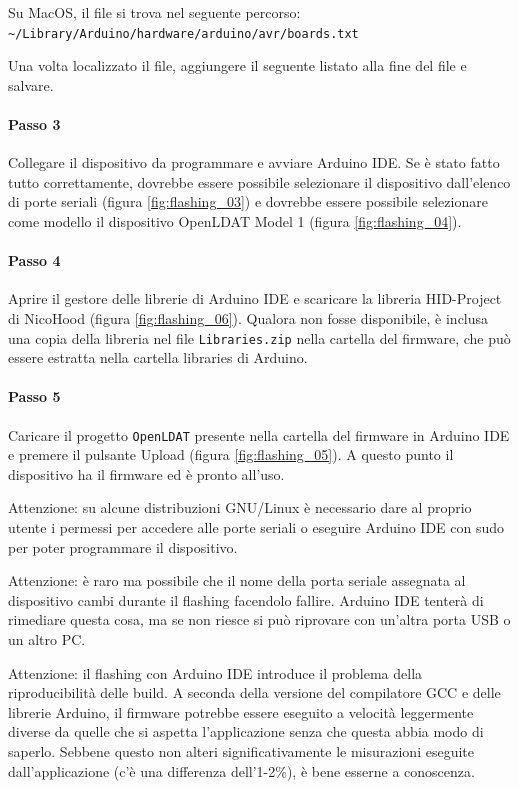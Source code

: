 Su MacOS, il file si trova nel seguente percorso:\\
	\texttt{\textasciitilde/Library/Arduino/hardware/arduino/avr/boards.txt}

Una volta localizzato il file, aggiungere il seguente listato alla fine del file e salvare.


\paragraph{Passo 3} Collegare il dispositivo da programmare e avviare Arduino IDE. Se è stato fatto tutto correttamente, dovrebbe essere possibile selezionare il dispositivo dall'elenco di porte seriali (figura \ref{fig:flashing_03}) e dovrebbe essere possibile selezionare come modello il dispositivo OpenLDAT Model 1 (figura \ref{fig:flashing_04}).

\paragraph{Passo 4} Aprire il gestore delle librerie di Arduino IDE e scaricare la libreria HID-Project di NicoHood (figura \ref{fig:flashing_06}). Qualora non fosse disponibile, è inclusa una copia della libreria nel file \texttt{Libraries.zip} nella cartella del firmware, che può essere estratta nella cartella libraries di Arduino.

\paragraph{Passo 5} Caricare il progetto \texttt{OpenLDAT} presente nella cartella del firmware in Arduino IDE e premere il pulsante Upload (figura \ref{fig:flashing_05}). A questo punto il dispositivo ha il firmware ed è pronto all'uso.

Attenzione: su alcune distribuzioni GNU/Linux è necessario dare al proprio utente i permessi per accedere alle porte seriali o eseguire Arduino IDE con sudo per poter programmare il dispositivo.

Attenzione: è raro ma possibile che il nome della porta seriale assegnata al dispositivo cambi durante il flashing facendolo fallire. Arduino IDE tenterà di rimediare questa cosa, ma se non riesce si può riprovare con un'altra porta USB o un altro PC.

Attenzione: il flashing con Arduino IDE introduce il problema della riproducibilità delle build. A seconda della versione del compilatore GCC e delle librerie Arduino, il firmware potrebbe essere eseguito a velocità leggermente diverse da quelle che si aspetta l'applicazione senza che questa abbia modo di saperlo. Sebbene questo non alteri significativamente le misurazioni eseguite dall'applicazione (c'è una differenza dell'1-2\%), è bene esserne a conoscenza.


